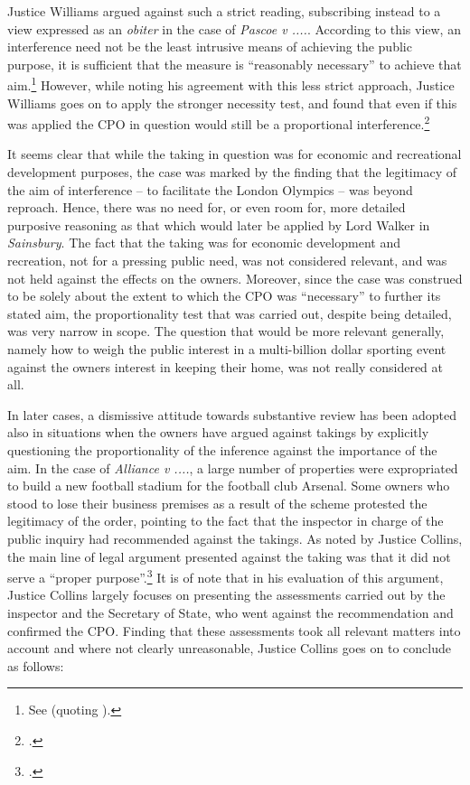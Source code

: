 Justice Williams argued against such a strict reading, subscribing instead to a view expressed as an {\it obiter} in the case of {\it Pascoe v ....}. According to this view, an interference need not be the least intrusive means of achieving the public purpose, it is sufficient that the measure is ``reasonably necessary'' to achieve that aim.\footnote{See \cite[74-75]{pascoe06} (quoting \cite[25]{clay04}).} However, while noting his agreement with this less strict approach, Justice Williams goes on to apply the stronger necessity test, and found that even if this was applied the CPO in question would still be a proportional interference.\footcite[41-50]{smith08}

It seems clear that while the taking in question was for economic and recreational development purposes, the case was marked by the finding that the legitimacy of the aim of interference -- to facilitate the London Olympics -- was beyond reproach. Hence, there was no need for, or even room for, more detailed purposive reasoning as that which would later be applied by Lord Walker in {\it Sainsbury}. The fact that the taking was for economic development and recreation, not for a pressing public need, was not considered relevant, and was not held against the effects on the owners. Moreover, since the case was construed to be solely about the extent to which the CPO was ``necessary'' to further its stated aim, the proportionality test that was carried out, despite being detailed, was very narrow in scope. The question that would be more relevant generally, namely how to weigh the public interest in a multi-billion dollar sporting event against the owners interest in keeping their home, was not really considered at all.

In later cases, a dismissive attitude towards substantive review has been adopted also in situations when the owners have argued against takings by explicitly questioning the proportionality of the inference against the importance of the aim. In the case of {\it Alliance v ....}, a large number of properties were expropriated to build a new football stadium for the football club Arsenal. Some owners who stood to lose their business premises as a result of the scheme protested the legitimacy of the order, pointing to the fact that the inspector in charge of the public inquiry had recommended against the takings. As noted by Justice Collins, the main line of legal argument presented against the taking was that it did not serve a ``proper purpose''.\footcite[19]{alliance06} It is of note that in his evaluation of this argument, Justice Collins largely focuses on presenting the assessments carried out by the inspector and the Secretary of State, who went against the recommendation and confirmed the CPO. Finding that these assessments took all relevant matters into account and where not clearly unreasonable, Justice Collins goes on to conclude as follows: 


